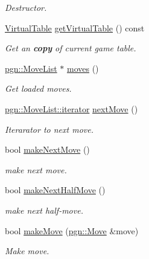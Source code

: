\begin{DoxyCompactItemize}
\begin{DoxyCompactList}\small\item\em Destructor. \item\end{DoxyCompactList}\item 
\hyperlink{classChEngn_1_1Table}{VirtualTable} \hyperlink{classChEngn_1_1Engine_a26f8db48e99d547fbc41eaa9dca8e6cf}{getVirtualTable} () const 
\begin{DoxyCompactList}\small\item\em Get an {\bfseries copy} of current game table. \item\end{DoxyCompactList}\item 
\hyperlink{classpgn_1_1MoveList}{pgn::MoveList} $\ast$ \hyperlink{classChEngn_1_1Engine_aad1f51b4eed22bb6eab999ffb7fa2516}{moves} ()
\begin{DoxyCompactList}\small\item\em Get loaded moves. \item\end{DoxyCompactList}\item 
\hyperlink{classpgn_1_1MoveList_1_1iterator}{pgn::MoveList::iterator} \hyperlink{classChEngn_1_1Engine_ad35252a7c6a7e84a34d12a688360a75f}{nextMove} ()
\begin{DoxyCompactList}\small\item\em Iterarator to next move. \item\end{DoxyCompactList}\item 
bool \hyperlink{classChEngn_1_1Engine_a16b3f2bb7787bccf321f8a03935947c2}{makeNextMove} ()
\begin{DoxyCompactList}\small\item\em make next move. \item\end{DoxyCompactList}\item 
bool \hyperlink{classChEngn_1_1Engine_ab9f6f3cbf3e7866887b049f61f9ce46b}{makeNextHalfMove} ()
\begin{DoxyCompactList}\small\item\em make next half-\/move. \item\end{DoxyCompactList}\item 
bool \hyperlink{classChEngn_1_1Engine_a3bfc7cfe7e147e4d5d7f645d0cb72c8d}{makeMove} (\hyperlink{classpgn_1_1Move}{pgn::Move} \&move)
\begin{DoxyCompactList}\small\item\em Make move. \item\end{DoxyCompactList}\item 

\end{DoxyCompactItemize}
